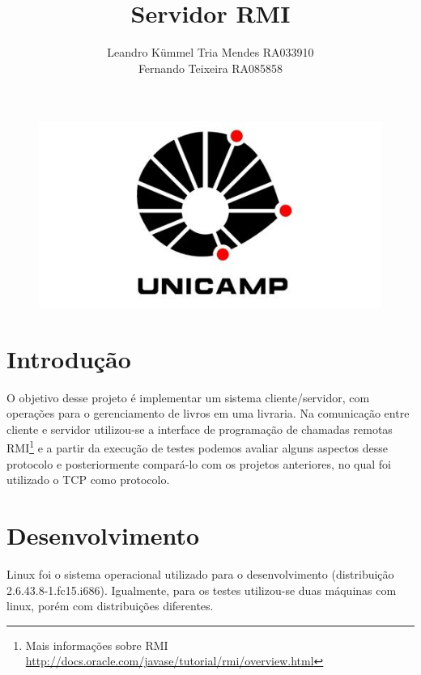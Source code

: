 \documentclass[a4paper,10pt]{article}
\title{Servidor RMI}
\author{Leandro Kümmel Tria Mendes RA033910 \\ Fernando Teixeira RA085858}
\begin{document}
\maketitle
\begin{figure}[!htb]
  \centering
  \includegraphics[scale=0.5]{logo.jpg}
\end{figure}
\newpage
\tableofcontents
\listoffigures
\listoftables
\newpage
\section{Introdução}
O objetivo desse projeto é implementar um sistema cliente/servidor, com operações para o gerenciamento de livros em uma livraria.
Na comunicação entre cliente e servidor utilizou-se a interface de programação de chamadas remotas RMI\footnote{
Mais informações sobre RMI \url{http://docs.oracle.com/javase/tutorial/rmi/overview.html} } e a partir da execução de testes podemos avaliar alguns aspectos
desse protocolo e posteriormente compará-lo com os projetos anteriores, no qual foi utilizado o TCP como protocolo.
\section{Desenvolvimento}
Linux foi o sistema operacional utilizado para o desenvolvimento (distribuição
2.6.43.8-1.fc15.i686). Igualmente, para os testes utilizou-se duas máquinas com linux, porém com distribuições diferentes.
\end{document}
